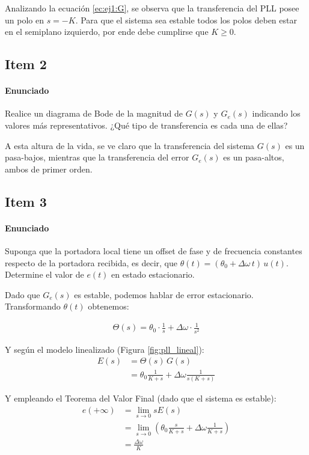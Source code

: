 Analizando la ecuación \ref{ec:ej1:G}, se observa que la transferencia del PLL posee un polo en $s=-K$. Para que el sistema sea estable todos los polos deben estar en el semiplano izquierdo, por ende debe cumplirse que $K \ge 0$.

\subsection{Item 2} \paragraph{Enunciado}Realice un diagrama de Bode de la magnitud de $G(s)$ y $G_e(s)$ indicando los valores más representativos. ¿Qué tipo de transferencia es cada una de ellas?

A esta altura de la vida, se ve claro que la transferencia del sistema $G(s)$ es un pasa-bajos, mientras que la transferencia del error $G_e(s)$ es un pasa-altos, ambos de primer orden.

\subsection{Item 3}  \paragraph{Enunciado}Suponga que la portadora local tiene un offset de fase y de frecuencia constantes respecto de la portadora recibida, es decir, que $\theta(t) = (\theta_0 + \Delta\omega\, t)\, u(t)$. Determine el valor de $e(t)$ en estado estacionario.

Dado que $G_e(s)$ es estable, podemos hablar de error estacionario. Transformando $\theta(t)$ obtenemos:

\begin{align}
	\Theta(s) = \theta_0 \cdot \frac{1}{s} + \Delta\omega \cdot \frac{1}{s^2}
\end{align}

Y según el modelo linealizado (Figura \ref{fig:pll_lineal}):
\begin{align}
	E(s) 	&= \Theta(s)\, G(s) \nonumber\\
			&= \theta_0 \frac{1}{K+s} + \Delta\omega \frac{1}{s(K+s)}
\end{align}

Y empleando el Teorema del Valor Final (dado que el sistema es estable):
\begin{align}
	e(+\infty) 	&= \lim\limits_{s \to 0} s E(s) \nonumber\\
				&= \lim\limits_{s \to 0} \left( \theta_0 \frac{s}{K+s} + \Delta\omega \frac{1}{K+s} \right) \nonumber\\
				&= \frac{\Delta\omega}{K}
\end{align}

